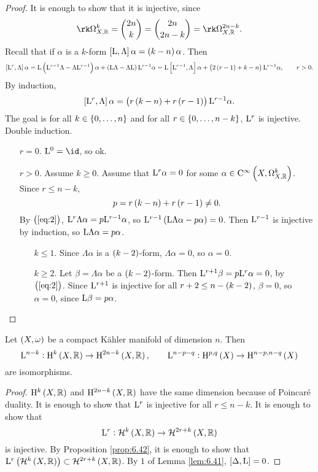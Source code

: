 \begin{proof}
It is enough to show that it is injective, since
$$ \rk \Omega_{X, \RR}^k = \binom{2n}{k} = \binom{2n}{2n - k} = \rk \Omega_{X, \RR}^{2n - k}. $$
Recall that if $ \alpha $ is a $ k $-form $ \sbr{\L, \Lambda}\alpha = \br{k - n}\alpha $. Then
$$ \sbr{\L^r, \Lambda}\alpha = \L\br{\L^{r - 1}\Lambda - \Lambda\L^{r - 1}}\alpha + \br{\L\Lambda - \Lambda\L}\L^{r - 1}\alpha = \L\sbr{\L^{r - 1}, \Lambda}\alpha + \br{2\br{r - 1} + k - n}\L^{r - 1}\alpha, \qquad r > 0. $$
By induction,
\begin{equation}
\label{eq:2}
\sbr{\L^r, \Lambda}\alpha = \br{r\br{k - n} + r\br{r - 1}}\L^{r - 1}\alpha.
\end{equation}
The goal is for all $ k \in \cbr{0, \dots, n} $ and for all $ r \in \cbr{0, \dots, n - k} $, $ \mathrm{L}^r $ is injective. Double induction.
\begin{itemize}[leftmargin=0.5in]
\item[$ r = 0 $.] $ \L^0 = \id $, so ok.
\item[$ r > 0 $.] Assume $ k \ge 0 $. Assume that $ \mathrm{L}^r\alpha = 0 $ for some $ \alpha \in \Ci{X, \Omega_{X, \RR}^k} $. Since $ r \le n - k $,
$$ p = r\br{k - n} + r\br{r - 1} \ne 0. $$
By $ \br{\ref{eq:2}} $, $ \mathrm{L}^r\Lambda\alpha = p\mathrm{L}^{r - 1}\alpha $, so $ \L^{r - 1}\br{\L\Lambda\alpha - p\alpha} = 0 $. Then $ \mathrm{L}^{r - 1} $ is injective by induction, so $ \mathrm{L}\Lambda\alpha = p\alpha $.
\begin{itemize}[leftmargin=0.5in]
\item[$ k \le 1 $.] Since $ \Lambda\alpha $ is a $ \br{k - 2} $-form, $ \Lambda\alpha = 0 $, so $ \alpha = 0 $.
\item[$ k \ge 2 $.] Let $ \beta = \Lambda\alpha $ be a $ \br{k - 2} $-form. Then $ \mathrm{L}^{r + 1}\beta = p\mathrm{L}^r\alpha = 0 $, by $ \br{\ref{eq:2}} $. Since $ \mathrm{L}^{r + 1} $ is injective for all $ r + 2 \le n - \br{k - 2} $, $ \beta = 0 $, so $ \alpha = 0 $, since $ \mathrm{L}\beta = p\alpha $.
\end{itemize}
\end{itemize}
\end{proof}

\begin{theorem}
Let $ \br{X, \omega} $ be a compact K\"ahler manifold of dimension $ n $. Then
$$ \L^{n - k} : \H^k\br{X, \RR} \to \H^{2n - k}\br{X, \RR}, \qquad \L^{n - p - q} : \H^{p, q}\br{X} \to \H^{n - p, n - q}\br{X} $$
are isomorphisms.
\end{theorem}

\begin{proof}
$ \H^k\br{X, \RR} $ and $ \H^{2n - k}\br{X, \RR} $ have the same dimension because of Poincar\'e duality. It is enough to show that $ \mathrm{L}^r $ is injective for all $ r \le n - k $. It is enough to show that
$$ \L^r : \HHH^k\br{X, \RR} \to \HHH^{2r + k}\br{X, \RR} $$
is injective. By Proposition \ref{prop:6.42}, it is enough to show that $ \L^r\br{\HHH^k\br{X, \RR}} \subset \HHH^{2r + k}\br{X, \RR} $. By $ 1 $ of Lemma \ref{lem:6.41}, $ \sbr{\Delta, \L} = 0 $.
\end{proof}

